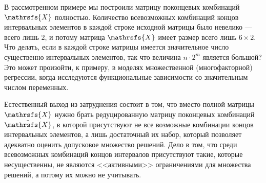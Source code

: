 \documentclass[a5paper,openany]{book}
\newcommand{\calX}{\mathrsfs{X}}
\begin{document}
В рассмотренном примере мы построили матрицу поконцевых комбинаций $\calX$ полностью.  
Количество всевозможных комбинаций концов интервальных элементов в каждой строке исходной 
матрицы было невелико --- всего лишь $2$, и потому матрица $\calX$ имеет размер всего 
лишь $6\times 2$. Что делать, если в каждой строке матрицы имеется значительное число 
существенно интервальных элементов, так что величина $n\cdot 2^m$ является большой? 
Это может произойти, к примеру, в моделях множественной (многофакторной) регрессии, 
когда исследуются функциональные зависимости со значительным числом переменных.  
  
Естественный выход из затруднения состоит в том, что вместо полной матрицы $\calX$ нужно 
брать редуцированную матрицу поконцевых комбинаций $\tilde{\calX}$, в которой присутствуют 
не все возможные комбинации концов интервальных элементов, а лишь достаточный их набор, 
который позволяет адекватно оценить допусковое множество решений. Дело в том, что среди 
всевозможных комбинаций концов интервалов присутствуют такие, которые несущественны, 
не являются <<активными>> ограничениями для множества решений, а потому их можно 
не учитывать. 
  
\end{document}
